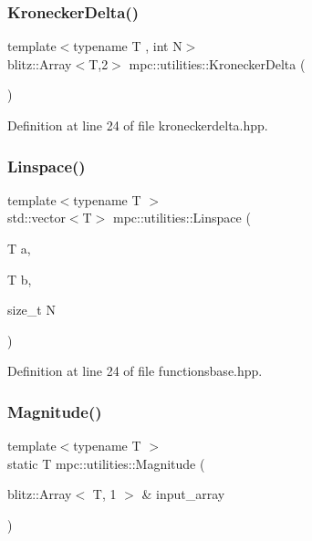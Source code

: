 \mbox{\label{namespacempc_1_1utilities_aee39ac77e4aad3a854879829eed39b37}} 
\subsubsection{\texorpdfstring{Kronecker\+Delta()}{KroneckerDelta()}}
{\footnotesize\ttfamily template$<$typename T , int N$>$ \\
blitz\+::\+Array$<$T,2$>$ mpc\+::utilities\+::\+Kronecker\+Delta (\begin{DoxyParamCaption}{ }\end{DoxyParamCaption})}



Definition at line 24 of file kroneckerdelta.\+hpp.

\mbox{\label{namespacempc_1_1utilities_abb6b125ee38967fe00a7f47bf087b75a}} 
\subsubsection{\texorpdfstring{Linspace()}{Linspace()}}
{\footnotesize\ttfamily template$<$typename T $>$ \\
std\+::vector$<$T$>$ mpc\+::utilities\+::\+Linspace (\begin{DoxyParamCaption}\item[{T}]{a,  }\item[{T}]{b,  }\item[{size\+\_\+t}]{N }\end{DoxyParamCaption})}



Definition at line 24 of file functionsbase.\+hpp.

\mbox{\label{namespacempc_1_1utilities_a387fd6b2510b25009905e8121755c207}} 
\subsubsection{\texorpdfstring{Magnitude()}{Magnitude()}}
{\footnotesize\ttfamily template$<$typename T $>$ \\
static T mpc\+::utilities\+::\+Magnitude (\begin{DoxyParamCaption}\item[{blitz\+::\+Array$<$ T, 1 $>$ \&}]{input\+\_\+array }\end{DoxyParamCaption})\hspace{0.3cm}{\ttfamily [static]}}



